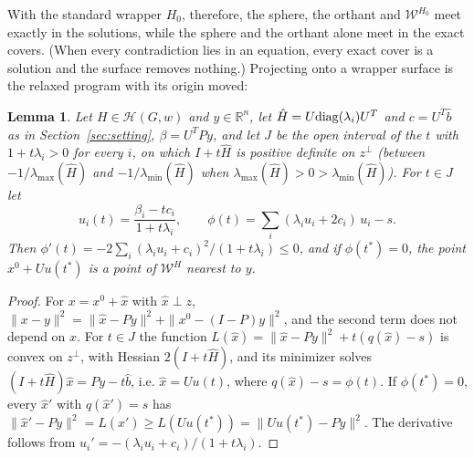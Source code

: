 \documentclass[11pt]{article}
\newtheorem{lem}[thm]{Lemma}
\theoremstyle{definition}
\theoremstyle{remark}
\newcommand{\R}{\mathbb{R}}
\newcommand{\Hc}{\mathcal{H}}
\newcommand{\Wc}{\mathcal{W}}
\newcommand{\hH}{\hat{H}}
\newcommand{\hb}{\hat{b}}
\newcommand{\hx}{\hat{x}}
\newcommand{\lmax}{\lambda_{\max}}
\newcommand{\lmin}{\lambda_{\min}}
\begin{document}
With the standard wrapper $H_0$, therefore, the sphere, the orthant and
$\Wc^{H_0}$ meet exactly in the solutions, while the sphere and the orthant
alone meet in the exact covers. (When every contradiction lies in an
equation, every exact cover is a solution and the surface removes nothing.)
Projecting onto a wrapper surface is the relaxed program with its origin
moved:

\begin{lem}
\label{lem:surfproj}
Let $H\in\Hc(G,w)$ and $y\in\R^n$, let $\hH=U{\rm diag}(\lambda_i)U^T$ and
$c=U^T\hb$ as in Section~\ref{sec:setting}, $\beta=U^TPy$, and let $J$ be
the open interval of the $t$ with $1+t\lambda_i>0$ for every $i$, on which
$I+t\hH$ is positive definite on $z^\perp$ (between $-1/\lmax(\hH)$ and
$-1/\lmin(\hH)$ when $\lmax(\hH)>0>\lmin(\hH)$). For $t\in J$ let
\[ u_i(t)=\frac{\beta_i-tc_i}{1+t\lambda_i}, \qquad
   \phi(t)=\sum_i(\lambda_iu_i+2c_i)\,u_i-s. \]
Then $\phi'(t)=-2\sum_i(\lambda_iu_i+c_i)^2/(1+t\lambda_i)\leq0$, and if
$\phi(t^*)=0$, the point $x^0+Uu(t^*)$ is a point of $\Wc^H$ nearest to $y$.
\end{lem}
\begin{proof}
For $x=x^0+\hx$ with $\hx\perp z$,
$\|x-y\|^2=\|\hx-Py\|^2+\|x^0-(I-P)y\|^2$, and the second term does not
depend on $x$. For $t\in J$ the function $L(\hx)=\|\hx-Py\|^2+t(q(\hx)-s)$
is convex on $z^\perp$, with Hessian $2(I+t\hH)$, and its minimizer solves
$(I+t\hH)\hx=Py-t\hb$, i.e. $\hx=Uu(t)$, where $q(\hx)-s=\phi(t)$. If
$\phi(t^*)=0$, every $\hx'$ with $q(\hx')=s$ has
$\|\hx'-Py\|^2=L(\hx')\geq L(Uu(t^*))=\|Uu(t^*)-Py\|^2$. The derivative
follows from $u_i'=-(\lambda_iu_i+c_i)/(1+t\lambda_i)$.
\end{proof}
\end{document}

